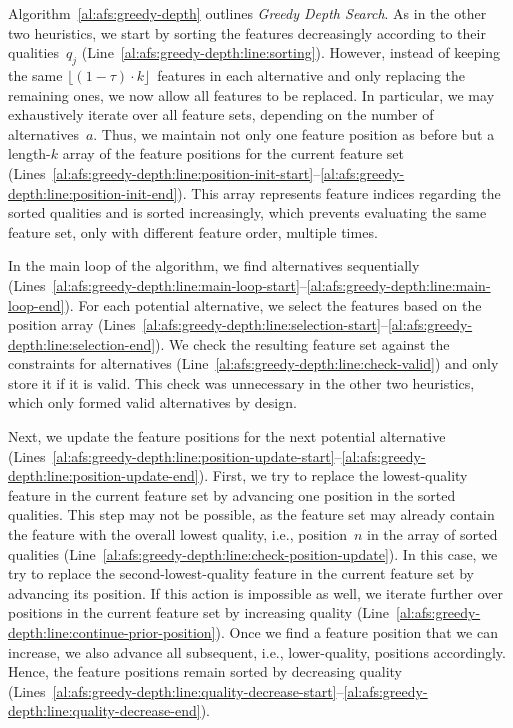 \documentclass{article}
\theoremstyle{definition}
\begin{document}
Algorithm~\ref{al:afs:greedy-depth} outlines \emph{Greedy Depth Search}.
As in the other two heuristics, we start by sorting the features decreasingly according to their qualities~$q_j$ (Line~\ref{al:afs:greedy-depth:line:sorting}).
However, instead of keeping the same $\lfloor (1 - \tau) \cdot k \rfloor$~features in each alternative and only replacing the remaining ones, we now allow all features to be replaced.
In particular, we may exhaustively iterate over all feature sets, depending on the number of alternatives~$a$.
Thus, we maintain not only one feature position as before but a length-$k$ array of the feature positions for the current feature set (Lines~\ref{al:afs:greedy-depth:line:position-init-start}--\ref{al:afs:greedy-depth:line:position-init-end}).
This array represents feature indices regarding the sorted qualities and is sorted increasingly, which prevents evaluating the same feature set, only with different feature order, multiple times.

In the main loop of the algorithm, we find alternatives sequentially
(Lines~\ref{al:afs:greedy-depth:line:main-loop-start}--\ref{al:afs:greedy-depth:line:main-loop-end}).
For each potential alternative, we select the features based on the position array (Lines~\ref{al:afs:greedy-depth:line:selection-start}--\ref{al:afs:greedy-depth:line:selection-end}).
We check the resulting feature set against the constraints for alternatives (Line~\ref{al:afs:greedy-depth:line:check-valid}) and only store it if it is valid.
This check was unnecessary in the other two heuristics, which only formed valid alternatives by design.

Next, we update the feature positions for the next potential alternative (Lines~\ref{al:afs:greedy-depth:line:position-update-start}--\ref{al:afs:greedy-depth:line:position-update-end}).
First, we try to replace the lowest-quality feature in the current feature set by advancing one position in the sorted qualities.
This step may not be possible, as the feature set may already contain the feature with the overall lowest quality, i.e., position~$n$ in the array of sorted qualities (Line~\ref{al:afs:greedy-depth:line:check-position-update}).
In this case, we try to replace the second-lowest-quality feature in the current feature set by advancing its position.
If this action is impossible as well, we iterate further over positions in the current feature set by increasing quality (Line~\ref{al:afs:greedy-depth:line:continue-prior-position}).
Once we find a feature position that we can increase, we also advance all subsequent, i.e., lower-quality, positions accordingly.
Hence, the feature positions remain sorted by decreasing quality (Lines~\ref{al:afs:greedy-depth:line:quality-decrease-start}--\ref{al:afs:greedy-depth:line:quality-decrease-end}).
\end{document}
